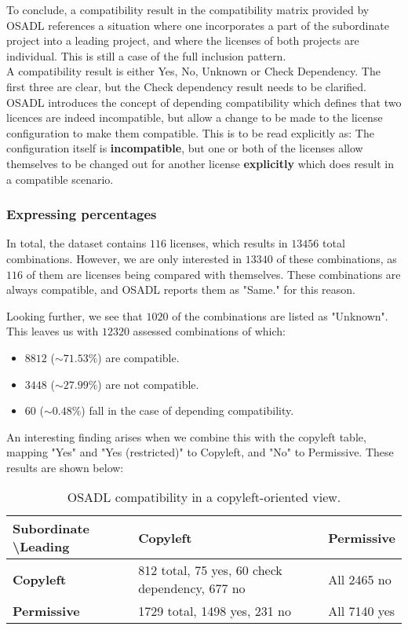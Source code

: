 To conclude, a compatibility result in the compatibility matrix provided by OSADL references a situation where one incorporates a part of the subordinate project into a leading project, and where the licenses of both projects are individual. This is still a case of the full inclusion pattern. \\

A compatibility result is either Yes, No, Unknown or Check Dependency. The first three are clear, but the Check dependency result needs to be clarified. OSADL introduces the concept of depending compatibility which defines that two licences are indeed incompatible, but allow a change to be made to the license configuration to make them compatible. This is to be read explicitly as: The configuration itself is \textbf{incompatible}, but one or both of the licenses allow themselves to be changed out for another license \textbf{explicitly} which does result in a compatible scenario.

\subsubsection{Expressing percentages}

In total, the dataset contains $116$ licenses, which results in $13456$ total combinations. However, we are only interested in $13340$ of these combinations, as $116$ of them are licenses being compared with themselves. These combinations are always compatible, and OSADL reports them as "Same." for this reason.

Looking further, we see that $1020$ of the combinations are listed as "Unknown". This leaves us with $12320$ assessed combinations of which:

\begin{itemize}
	\item $8812$ ($\sim 71.53\%$) are compatible.
	\item $3448$ ($\sim 27.99\%$) are not compatible.
	\item $60$ ($\sim 0.48\%$) fall in the case of depending compatibility.
\end{itemize}

An interesting finding arises when we combine this with the copyleft table, mapping "Yes" and "Yes (restricted)" to Copyleft, and "No" to Permissive. These results are shown below:

\begin{table}[h]
	\caption{OSADL compatibility in a copyleft-oriented view.}
	\label{tab:osadl-compat-numbers}
	\centering
	\begin{tabular}{l|ll}
		\hline
		\textbf{Subordinate \textbackslash Leading} & \textbf{Copyleft} & \textbf{Permissive} \\ \hline
		\textbf{Copyleft} & 812 total, 75 yes, 60 check dependency, 677 no & All 2465 no \\
		\textbf{Permissive} & 1729 total, 1498 yes, 231 no & All 7140 yes \\\hline
	\end{tabular}
\end{table}

